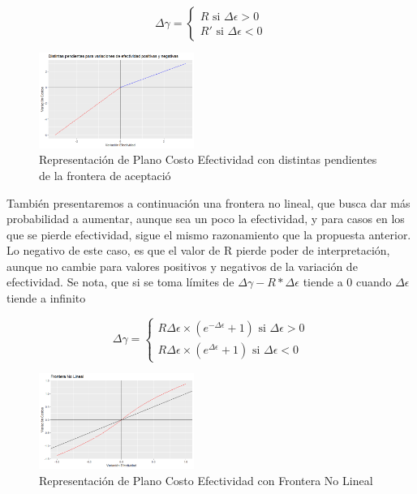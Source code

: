 \documentclass{siep}
\begin{document}
\begin{equation}
\Delta\gamma =
\begin{cases}
R  \text{  si  } \Delta\epsilon>0\\
R'  \text{  si  } \Delta\epsilon<0
\end{cases}
\end{equation}

\begin{figure}[htbp]
	\centering
	\includegraphics[width=0.45\textwidth]{grafi/Frontera_Partida.jpg}
	\caption{Representación de Plano Costo Efectividad con distintas pendientes de la frontera de aceptació}
	\label{fig:5}
\end{figure}


También presentaremos a continuación una frontera no lineal, que busca dar más probabilidad a aumentar, aunque sea un poco la efectividad, y para casos en los que se pierde efectividad, sigue el mismo razonamiento que la propuesta anterior. Lo negativo de este caso, es que el valor de R pierde poder de interpretación, aunque no cambie para valores positivos y negativos de la variación de efectividad.
Se nota, que si se toma límites de $\Delta\gamma-R*\Delta\epsilon$ tiende a 0 cuando $\Delta\epsilon$ tiende a infinito

\begin{equation}
\Delta\gamma =
\begin{cases}
R\Delta\epsilon \times(e^{-\Delta\epsilon} + 1)  \text{  si  } \Delta\epsilon>0\\
R\Delta\epsilon \times(e^{\Delta\epsilon} + 1)  \text{  si  } \Delta\epsilon<0
\end{cases}
\end{equation}

\begin{figure}[htbp]
	\centering
	\includegraphics[width=0.45\textwidth]{grafi/Frontera_No_Lineal.jpg}
	\caption{Representación de Plano Costo Efectividad con Frontera No Lineal}
	\label{fig:6}
\end{figure}
\end{document}
